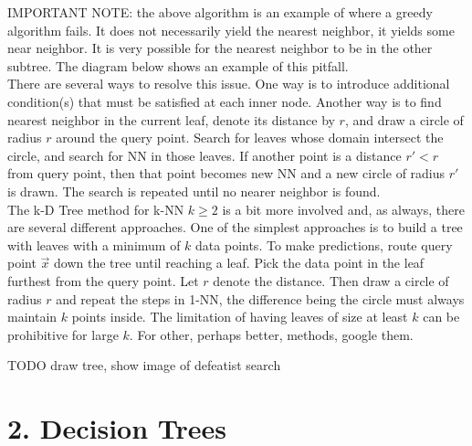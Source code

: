 \documentclass[10pt]{article}
\begin{document}
		\noindent IMPORTANT NOTE:  the above algorithm is an example of where a greedy algorithm fails. 
		It does not necessarily yield the nearest neighbor, it yields some near neighbor. It is very possible for 
		the nearest neighbor to be in the other subtree. The diagram below shows an example of this pitfall. \\
		
		There are several ways to resolve this issue. One way is to introduce additional condition(s) that must 
		be satisfied at each inner node. Another way is to find nearest neighbor in the current leaf, denote its 
		distance by $r$, and draw a circle of radius $r$ around the query point. Search for leaves whose domain 
		intersect the circle, and search for NN in those leaves. If another point is a distance $r' < r$ from query 
		point, then that point becomes new NN and a new circle of radius $r'$ is drawn. The search is repeated 
		until no nearer neighbor is found.  \\
		
		The k-D Tree method for k-NN $k \geq 2$ is a bit more involved and, as always, there are several different
		approaches. One of the simplest approaches is to build a tree with leaves with a minimum of $k$ data points.
		To make predictions, route query point $\vec x$ down the tree until reaching a leaf. Pick the data point in 
		the leaf furthest from the query point. Let $r$ denote the distance. Then draw a circle of radius $r$ and repeat
		the steps in 1-NN, the difference being the circle must always maintain $k$ points inside. The limitation of
		having leaves of size at least $k$ can be prohibitive for large $k$. For other, perhaps better, methods, 
		google them. 
		
	
	TODO draw tree, show image of defeatist search  

	
\section*{2. Decision Trees}
\end{document}
